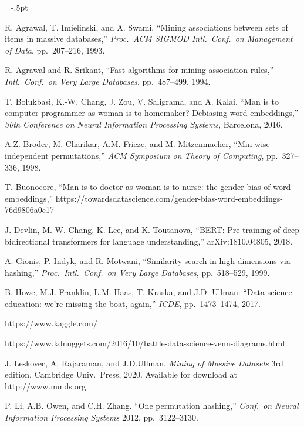 \documentclass[11pt]{article}
\begin{document}
\vspace{-.1cm}

\begin{thebibliography}{10}
\begin{small}
\itemsep=-.5pt

R. Agrawal, T. Imielinski, and A. Swami,
``Mining associations between sets of items in massive databases,''
{\em Proc.\ ACM SIGMOD Intl.\ Conf.\ on Management of Data},
pp.~207--216, 1993.

R. Agrawal and R. Srikant,
``Fast algorithms for mining association rules,''
{\em Intl.\ Conf.\ on Very Large Databases}, pp.~487--499, 1994.

T. Bolukbasi, K.-W. Chang, J. Zou, V. Saligrama, and A. Kalai,
``Man is to computer programmer as woman is to homemaker? Debiasing word embeddings,''
{\em 30th Conference on Neural Information Processing Systems}, Barcelona, 2016.

A.Z. Broder, M. Charikar, A.M. Frieze, and M. Mitzenmacher,
``Min-wise independent permutations,''
{\em ACM Symposium on Theory of Computing}, pp.~327--336, 1998.

T. Buonocore, ``Man is to doctor as woman is to nurse: the gender bias of word embeddings,'' https://towardsdatascience.com/gender-bias-word-embeddings-76d9806a0e17

J. Devlin, M.-W. Chang, K. Lee, and K. Toutanova,
``BERT: Pre-training of deep bidirectional transformers for language understanding,''
arXiv:1810.04805, 2018.

A. Gionis, P. Indyk, and R. Motwani,
``Similarity search in high dimensions via hashing,''
{\em Proc.\ Intl.\ Conf.\ on Very Large Databases}, pp.~518--529, 1999.

B. Howe, M.J. Franklin, L.M. Haas, T. Kraska, and J.D. Ullman:
``Data science education: we're missing the boat, again,'' {\em ICDE}, pp.~1473--1474, 2017.

https://www.kaggle.com/

https://www.kdnuggets.com/2016/10/battle-data-science-venn-diagrams.html

J. Leskovec, A. Rajaraman, and J.D.Ullman,
{\em Mining of Massive Datasets} 3rd edition, Cambridge Univ.\ Press, 2020.  Available for download at http://www.mmds.org

P. Li, A.B. Owen, and C.H. Zhang.
``One permutation hashing,''
{\em Conf.\ on Neural Information Processing Systems} 2012, pp.~3122--3130.


\end{small}
\end{thebibliography}
\end{document}
